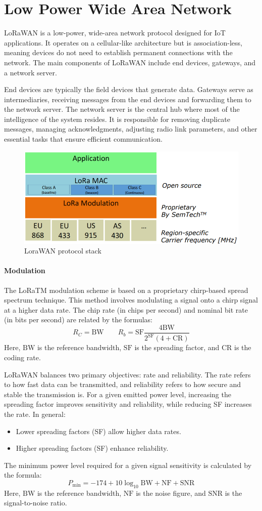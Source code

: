 \section{Low Power Wide Area Network}

LoRaWAN is a low-power, wide-area network protocol designed for IoT applications. 
It operates on a cellular-like architecture but is association-less, meaning devices do not need to establish permanent connections with the network. 
The main components of LoRaWAN include end devices, gateways, and a network server.

End devices are typically the field devices that generate data. 
Gateways serve as intermediaries, receiving messages from the end devices and forwarding them to the network server. 
The network server is the central hub where most of the intelligence of the system resides.
It is responsible for removing duplicate messages, managing acknowledgments, adjusting radio link parameters, and other essential tasks that ensure efficient communication.

\begin{figure}[H]
    \centering
    \includegraphics[width=0.5\linewidth]{images/lora.png}
    \caption{LoraWAN protocol stack}
\end{figure}

\paragraph*{Modulation}
The LoRaTM modulation scheme is based on a proprietary chirp-based spread spectrum technique. 
This method involves modulating a signal onto a chirp signal at a higher data rate. 
The chip rate (in chips per second) and nominal bit rate (in bits per second) are related by the formulas:
\[R_C=\text{BW}\qquad R_b=\text{SF}\dfrac{4\text{BW}}{2^{\text{SF}}(4+\text{CR})}\]
Here, $\text{BW}$ is the reference bandwidth, $\text{SF}$ is the spreading factor, and $\text{CR}$ is the coding rate. 

LoRaWAN balances two primary objectives: rate and reliability. 
The rate refers to how fast data can be transmitted, and reliability refers to how secure and stable the transmission is. 
For a given emitted power level, increasing the spreading factor improves sensitivity and reliability, while reducing SF increases the rate.
In general:
\begin{itemize}
    \item Lower spreading factors (SF) allow higher data rates.
    \item Higher spreading factors (SF) enhance reliability.
\end{itemize}
\noindent The minimum power level required for a given signal sensitivity is calculated by the formula:
\[P_{\min}=-174+10\log_{10}\text{BW}+\text{NF}+\text{SNR}\]
Here, $\text{BW}$ is the reference bandwidth, $\text{NF}$ is the noise figure, and $\text{SNR}$ is the signal-to-noise ratio. 

